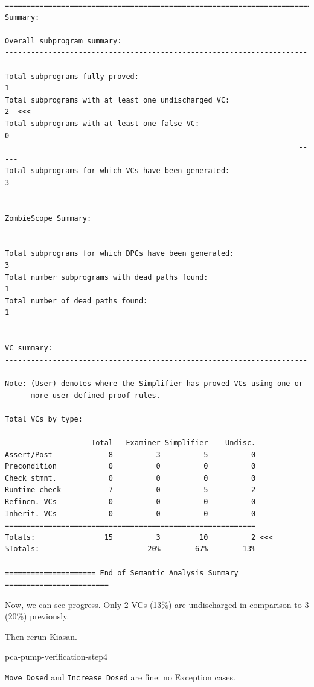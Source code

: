 \begin{lstlisting}[frame=single, gobble=0, caption={Second POGS report}]
===============================================================================
Summary:

Overall subprogram summary:
-------------------------------------------------------------------------
Total subprograms fully proved:                                         1
Total subprograms with at least one undischarged VC:                    2  <<<
Total subprograms with at least one false VC:                           0
                                                                    -----
Total subprograms for which VCs have been generated:                    3


ZombieScope Summary:
-------------------------------------------------------------------------
Total subprograms for which DPCs have been generated:                   3
Total number subprograms with dead paths found:                         1
Total number of dead paths found:                                       1


VC summary:
-------------------------------------------------------------------------
Note: (User) denotes where the Simplifier has proved VCs using one or
      more user-defined proof rules.

Total VCs by type:
------------------
                    Total   Examiner Simplifier    Undisc.
Assert/Post             8          3          5          0
Precondition            0          0          0          0
Check stmnt.            0          0          0          0
Runtime check           7          0          5          2
Refinem. VCs            0          0          0          0
Inherit. VCs            0          0          0          0
==========================================================
Totals:                15          3         10          2 <<<
%Totals:                         20%        67%        13%

===================== End of Semantic Analysis Summary ========================
\end{lstlisting}
\label{listing:pcapump_dosemonitor_pogs2}
\doublespacing

Now, we can see progress. Only 2 VCs (13\%) are undischarged in comparison to 3 (20\%) previously.

Then rerun Kiasan.

pca-pump-verification-step4

\lstinline{Move_Dosed} and \lstinline{Increase_Dosed} are fine: no Exception cases.

